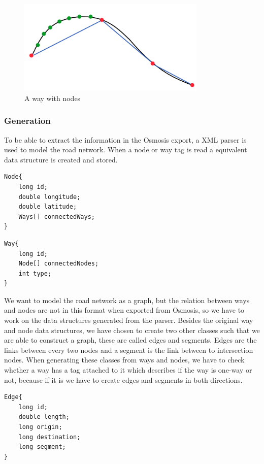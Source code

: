 \begin{figure}[h!]
  \centering
    \includegraphics[width=0.8\textwidth]{figures/way-w-nodes.png}
    \caption{A way with nodes}
    \label{fig:waywithnodes}
\end{figure}

\subsubsection{Generation}
To be able to extract the information in the Osmosis export, a XML parser is used to model the road network. When a node or way tag is read a equivalent data structure is created and stored. 
\begin{lstlisting}[style=java, caption=Datastructure for a node]
Node{
	long id;
	double longitude;
	double latitude;
	Ways[] connectedWays;
}
\end{lstlisting}

\begin{lstlisting}[style=java, caption=Datastructure for a way]
Way{
	long id;
	Node[] connectedNodes;
	int type;
}
\end{lstlisting}

We want to model the road network as a graph, but the relation between ways and nodes are not in this format when exported from Osmosis, so we have to work on the data structures generated from the parser.
Besides the original way and node data structures, we have chosen to create two other classes such that we are able to construct a graph, these are called edges and segments.
Edges are the links between every two nodes and a segment is the link between to intersection nodes. When generating these classes from ways and nodes, we have to check whether a way has a tag attached to it which describes if the way is one-way or not, because if it is we have to create edges and segments in both directions.

\begin{lstlisting}[style=java, caption=Datastructure for an edge]
Edge{
	long id;
	double length;
	long origin;
	long destination;
	long segment;
}
\end{lstlisting}


